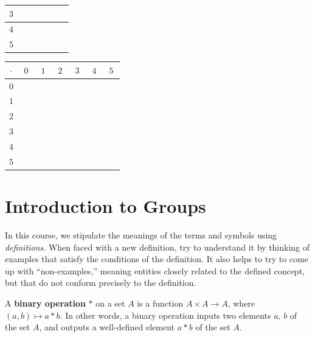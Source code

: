 \begin{enumerate}
\begin{center}
\begin{tabular}{|c||c|c|c|c|c|c|}
        $3$ & & & & & & \\ \hline
        $4$ & & & & & & \\ \hline
        $5$ & & & & & & \\ \hline
    \end{tabular}
    \hspace{0.5in}
    \begin{tabular}{|c||c|c|c|c|c|c|} \hline
        $\cdot$ & $0$ & $1$ & $2$ & $3$ & $4$ & $5$ \\ \hline \hline
        $0$ & $\phantom{00}$ & $\phantom{00}$ & $\phantom{00}$ & $\phantom{00}$ & $\phantom{00}$ & $\phantom{00}$ \\ \hline
        $1$ & & & & & & \\ \hline
        $2$ & & & & & & \\ \hline
        $3$ & & & & & & \\ \hline
        $4$ & & & & & & \\ \hline
        $5$ & & & & & & \\ \hline
    \end{tabular}
    \end{center}
\end{enumerate}

\chapter{Introduction to Groups}\label{chap:introgps}

In this course, we stipulate the meanings of the terms and symbols using \textit{definitions}. When faced with a new definition, try to understand it by thinking of examples that satisfy the conditions of the definition.  It also helps to try to come up with ``non-examples,'' meaning entities closely related to the defined concept, but that do not conform precisely to the definition.

\begin{definition}
    A \textbf{binary operation} \(*\) on a set \(A\) is a function \(A \times A \rightarrow A\), where \((a,b) \mapsto a*b\).  In other words, a binary operation inputs two elements \(a\), \(b\) of the set \(A\), and outputs a well-defined element \(a * b\) of the set \(A\).
\end{definition}

